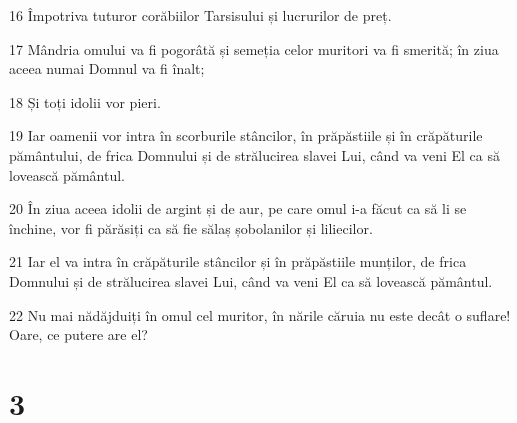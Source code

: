 \par 16 Împotriva tuturor corăbiilor Tarsisului și lucrurilor de preț.
\par 17 Mândria omului va fi pogorâtă și semeția celor muritori va fi smerită; în ziua aceea numai Domnul va fi înalt;
\par 18 Și toți idolii vor pieri.
\par 19 Iar oamenii vor intra în scorburile stâncilor, în prăpăstiile și în crăpăturile pământului, de frica Domnului și de strălucirea slavei Lui, când va veni El ca să lovească pământul.
\par 20 În ziua aceea idolii de argint și de aur, pe care omul i-a făcut ca să li se închine, vor fi părăsiți ca să fie sălaș șobolanilor și liliecilor.
\par 21 Iar el va intra în crăpăturile stâncilor și în prăpăstiile munților, de frica Domnului și de strălucirea slavei Lui, când va veni El ca să lovească pământul.
\par 22 Nu mai nădăjduiți în omul cel muritor, în nările căruia nu este decât o suflare! Oare, ce putere are el?

\chapter{3}

